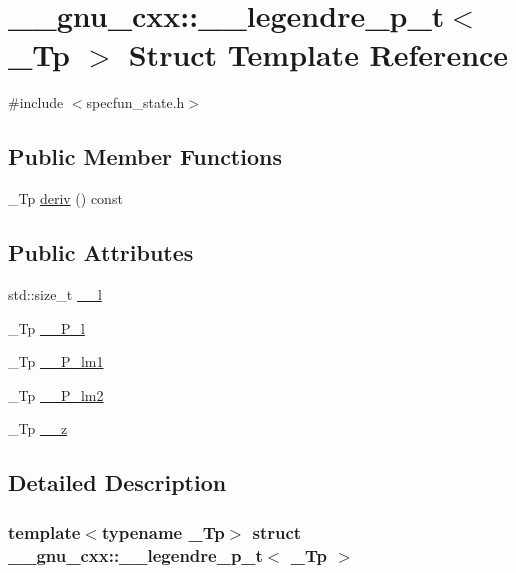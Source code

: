 \hypertarget{struct____gnu__cxx_1_1____legendre__p__t}{}\section{\+\_\+\+\_\+gnu\+\_\+cxx\+:\+:\+\_\+\+\_\+legendre\+\_\+p\+\_\+t$<$ \+\_\+\+Tp $>$ Struct Template Reference}
\label{struct____gnu__cxx_1_1____legendre__p__t}


{\ttfamily \#include $<$specfun\+\_\+state.\+h$>$}

\subsection*{Public Member Functions}
\begin{DoxyCompactItemize}
\item 
\+\_\+\+Tp \hyperlink{struct____gnu__cxx_1_1____legendre__p__t_a91e1b4e4049e5085b52342db2afbad9d}{deriv} () const
\end{DoxyCompactItemize}
\subsection*{Public Attributes}
\begin{DoxyCompactItemize}
\item 
std\+::size\+\_\+t \hyperlink{struct____gnu__cxx_1_1____legendre__p__t_a1dc68f604d546cb75e4009a7da9cc152}{\+\_\+\+\_\+l}
\item 
\+\_\+\+Tp \hyperlink{struct____gnu__cxx_1_1____legendre__p__t_a76c0a4fa069deeed203214f5e282d7d9}{\+\_\+\+\_\+\+P\+\_\+l}
\item 
\+\_\+\+Tp \hyperlink{struct____gnu__cxx_1_1____legendre__p__t_a8c8218ef16c4d7d980c94dba241b1682}{\+\_\+\+\_\+\+P\+\_\+lm1}
\item 
\+\_\+\+Tp \hyperlink{struct____gnu__cxx_1_1____legendre__p__t_a9090dfe57d4b5993828510fd0202c888}{\+\_\+\+\_\+\+P\+\_\+lm2}
\item 
\+\_\+\+Tp \hyperlink{struct____gnu__cxx_1_1____legendre__p__t_ad1ee2ca27099d0f3c75220247a0779f6}{\+\_\+\+\_\+z}
\end{DoxyCompactItemize}


\subsection{Detailed Description}
\subsubsection*{template$<$typename \+\_\+\+Tp$>$\newline
struct \+\_\+\+\_\+gnu\+\_\+cxx\+::\+\_\+\+\_\+legendre\+\_\+p\+\_\+t$<$ \+\_\+\+Tp $>$}

